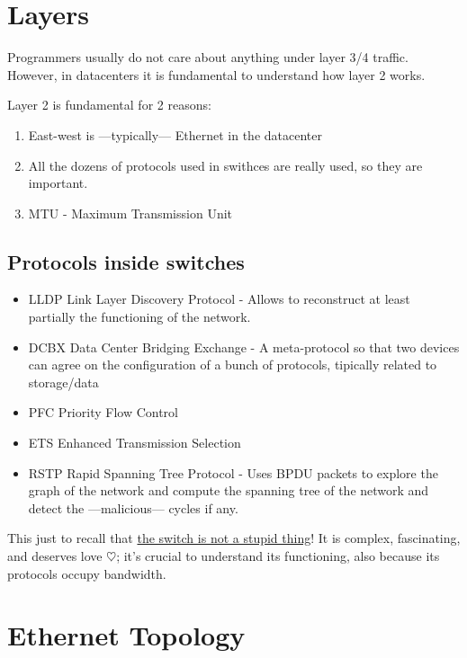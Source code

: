 \section{Layers}
Programmers usually do not care about anything under layer 3/4 traffic.
{\ns However, in datacenters it is fundamental to understand how layer 2 works.
}

Layer 2 is fundamental for 2 reasons:
\begin{enumerate}
   \item East-west is ---typically--- Ethernet in the datacenter
   \item All the dozens of protocols used in swithces are really used, so they are important.
   \item MTU - Maximum Transmission Unit
\end{enumerate}

\subsection{Protocols inside switches}
\begin{itemize}
   \item LLDP Link Layer Discovery Protocol - Allows to reconstruct at least partially the functioning of the network.
   \item DCBX Data Center Bridging Exchange - A meta-protocol so that two devices can agree on the configuration of a bunch of protocols, tipically related to storage/data 
   \item PFC Priority Flow Control
   \item ETS Enhanced Transmission Selection
   \item RSTP Rapid Spanning Tree Protocol - Uses BPDU packets to explore the graph of the network and compute the spanning tree of the network and detect the ---malicious--- cycles if any.
\end{itemize}

This just to recall that \ul{the switch is not a stupid thing}! It is complex, fascinating, and deserves love $\heartsuit$; it's crucial to understand its functioning, also because its protocols occupy bandwidth.

\section{Ethernet Topology}
